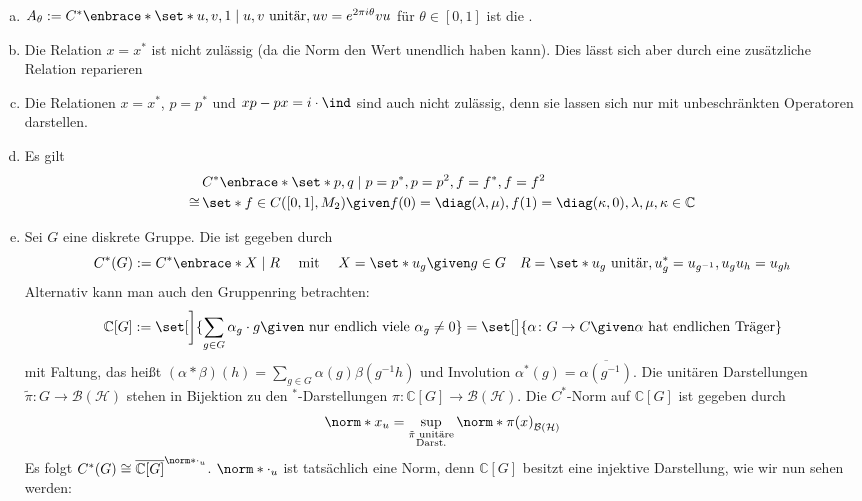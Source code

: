 \begin{beispiel}[{name=[Relationen und Erzeuger]}]
\begin{enumerate}[(i)]
\begin{enumerate}[a)]
			\item $A_\theta := C^* \enbrace*{\set*{u,v,1}\mid u,v \text{ unitär},uv=e^{2 \pi i \theta} vu }$ für $\theta \in [0,1]$ ist die .
			\item Die Relation $x=x^*$ ist nicht zulässig (da die Norm den Wert unendlich haben kann). Dies lässt sich aber durch eine zusätzliche Relation reparieren
			\item Die Relationen $x=x^*$, $p=p^*$ und $xp-px=i \cdot \ind$ sind auch nicht zulässig, denn sie lassen sich nur mit unbeschränkten Operatoren darstellen.
			\item Es gilt 
			\begin{align}
				&C^* \enbrace*{\set*{p,q} \mid p=p^*, p=p^2, f=f^*,f=f^2}\\ 
				\cong \,&\set*{f \in C([0,1],M_2) \given f(0)=\diag(\lambda,\mu), f(1)= \diag(\kappa,0), \lambda,\mu, \kappa \in \mathbb{C}}
			\end{align}
			\item Sei $G$ eine diskrete Gruppe. 
			Die  ist gegeben durch
			\[
				C^*(G) := C^* \enbrace*{X\mid R}\quad  \text{ mit } \quad X=\set*{u_g \given g \in G}  \quad R= \set*{u_g \text{ unitär}, u_g^*=u_{g^{-1}}, u_g u_h = u_{gh}}
			\]
			Alternativ kann man auch den Gruppenring betrachten:
			\[
				\mathbb{C}[G] := \set[\bigg]{\sum_{g \in G}\alpha_g \cdot g \given \text{ nur endlich viele } \alpha_g\neq 0} = \set[\big]{\alpha \colon G \to C \given \alpha \text{ hat endlichen Träger} }
			\]
			mit Faltung, das heißt $(\alpha * \beta)(h) = \sum_{g \in G} \alpha(g) \beta(g^{-1}h)$ und Involution $\alpha^*(g)=\overline{\alpha(g^{-1})}$.
			Die unitären Darstellungen $\tilde{\pi} \colon G \to \mathcal{B}(\mathcal{H})$ stehen in Bijektion zu den $^*$-Darstellungen $\pi \colon \mathbb{C}[G] \to \mathcal{B}(\mathcal{H})$.
			Die $C^*$-Norm auf $\mathbb{C}[G]$ ist gegeben durch
			\[
				\norm*{x}_u = \sup_{\substack{\tilde{\pi} \text{ unitäre} \\ \text{Darst.}}} \norm*{\pi(x)}_{\mathcal{B}(\mathcal{H})}
			\]
			Es folgt $C^*(G) \cong \overline{\mathbb{C}[G]}^{\norm*{\cdot}_u}$. $\norm*{\cdot}_u$ ist tatsächlich eine Norm, denn $\mathbb{C}[G]$ besitzt eine injektive Darstellung, wie wir nun sehen werden:
		\end{enumerate}
	\end{enumerate}
\end{beispiel}

